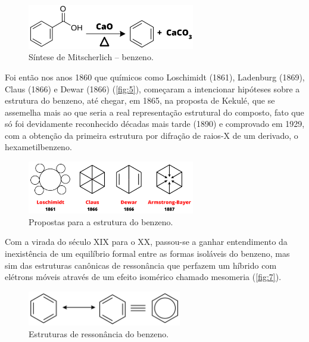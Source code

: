 \begin{figure}[htb]
	\caption{Síntese de Mitscherlich – benzeno.}
    \label{fig:4a}
	\begin{center}
		\includegraphics[width=0.65\textwidth]{images/fig2(2).png}
	\end{center}
\end{figure}

Foi então nos anos 1860 que químicos como Loschimidt (1861), Ladenburg (1869), Claus (1866) e Dewar (1866) (\autoref{fig:5}), começaram a intencionar hipóteses sobre a estrutura do benzeno, até chegar, em 1865, na proposta de Kekulé, que se assemelha mais ao que seria a real representação estrutural do composto, fato que só foi devidamente reconhecido décadas mais tarde (1890) e comprovado em 1929\autocite{Lonsdale1929}, com a obtenção da primeira estrutura por difração de raios-X de um derivado, o hexametilbenzeno.

\begin{figure}[htb]
	\caption{Propostas para a estrutura do benzeno.}
    \label{fig:5}
	\begin{center}
		\includegraphics[width=0.65\textwidth]{images/8(1).png}
	\end{center}
\end{figure}

Com a virada do século XIX para o XX, passou-se a ganhar entendimento da inexistência de
um equilíbrio formal entre as formas isoláveis do benzeno, mas sim das estruturas canônicas de ressonância que perfazem um híbrido com elétrons móveis através de um efeito isomérico chamado mesomeria \autocite{Murrell1956, INGOLD1934, Oudar1975} (\autoref{fig:7}). 

\begin{figure}[htb]
	\caption{Estruturas de ressonância do benzeno.}
    \label{fig:7}
	\begin{center}
		\includegraphics[width=0.6\textwidth]{images/7.png}
	\end{center}
\end{figure}

